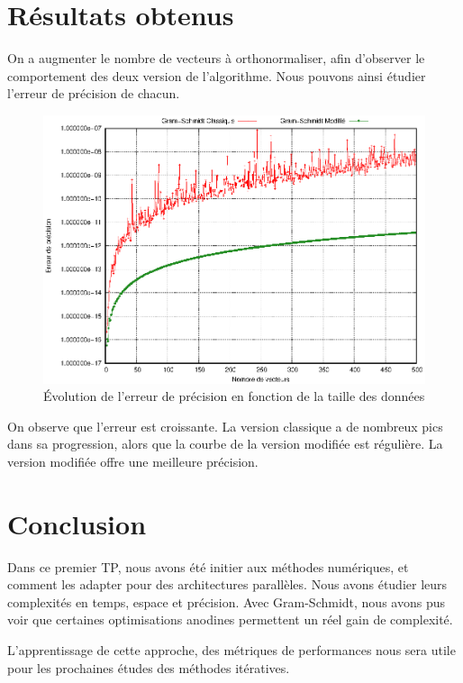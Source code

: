 \documentclass[a4paper]{article}
\begin{document}
\section{Résultats obtenus}

On a augmenter le nombre de vecteurs à orthonormaliser, afin d'observer le comportement des deux version de l'algorithme. Nous pouvons ainsi étudier l'erreur de précision de chacun.

\begin{figure}[h]
	\begin{center}
		\includegraphics[scale=0.80]{Courbes/gram_schmidt.eps}
	\end{center}
    \caption{Évolution de l'erreur de précision en fonction de la taille des données}
	\label{fig:courbe_gs}
\end{figure}

\FloatBarrier

On observe que l'erreur est croissante. La version classique a de nombreux pics dans sa progression, alors que la courbe de la version modifiée est régulière. La version modifiée offre une meilleure précision.


\section*{Conclusion}
Dans ce premier TP, nous avons été initier aux méthodes numériques, et comment les adapter pour des architectures parallèles. Nous avons étudier leurs complexités en temps, espace et précision. Avec Gram-Schmidt, nous avons pus voir que certaines optimisations anodines permettent un réel gain de complexité. 

L'apprentissage de cette approche, des métriques de performances nous sera utile pour les prochaines études des méthodes itératives.
\end{document}
